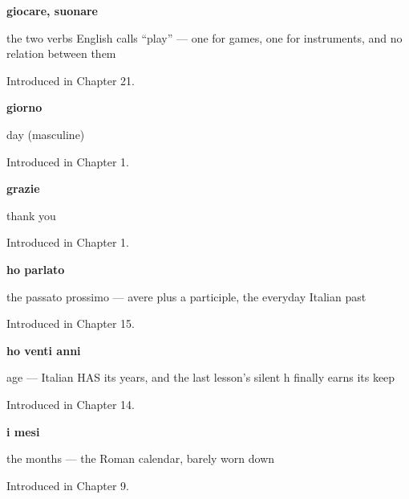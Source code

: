 \noindent\begin{minipage}[t]{\linewidth}
\raggedright
\textbf{giocare, suonare}\par
\small the two verbs English calls \textquotedblleft{}play\textquotedblright{} — one for games, one for instruments, and no relation between them\par
\footnotesize Introduced in Chapter 21.
\end{minipage}\par\medskip

\noindent\begin{minipage}[t]{\linewidth}
\raggedright
\textbf{giorno}\par
\small day (masculine)\par
\footnotesize Introduced in Chapter 1.
\end{minipage}\par\medskip

\noindent\begin{minipage}[t]{\linewidth}
\raggedright
\textbf{grazie}\par
\small thank you\par
\footnotesize Introduced in Chapter 1.
\end{minipage}\par\medskip

\noindent\begin{minipage}[t]{\linewidth}
\raggedright
\textbf{ho parlato}\par
\small the passato prossimo — avere plus a participle, the everyday Italian past\par
\footnotesize Introduced in Chapter 15.
\end{minipage}\par\medskip

\noindent\begin{minipage}[t]{\linewidth}
\raggedright
\textbf{ho venti anni}\par
\small age — Italian HAS its years, and the last lesson's silent h finally earns its keep\par
\footnotesize Introduced in Chapter 14.
\end{minipage}\par\medskip

\noindent\begin{minipage}[t]{\linewidth}
\raggedright
\textbf{i mesi}\par
\small the months — the Roman calendar, barely worn down\par
\footnotesize Introduced in Chapter 9.
\end{minipage}\par\medskip

